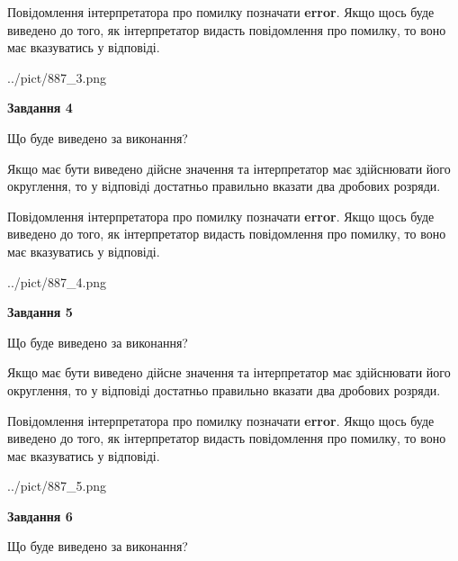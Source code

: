 \documentclass[12pt, ukrainian]{article}
\begin{document}
{\begin {Large}
Повідомлення інтерпретатора про помилку позначати \textbf{error}.
Якщо щось буде виведено до того, як інтерпретатор видасть повідомлення про помилку, 
то воно має вказуватись у відповіді. \par

\begin{center}
	{../pict/887_3.png}
\end{center}
\newpage

{\begin {center}\textbf{Завдання 4}\end {center}}\par
Що буде виведено за виконання? \par

Якщо має бути виведено дійсне значення та інтерпретатор має здійснювати його округлення, 
то у відповіді достатньо правильно вказати два дробових розряди.

Повідомлення інтерпретатора про помилку позначати \textbf{error}.
Якщо щось буде виведено до того, як інтерпретатор видасть повідомлення про помилку, 
то воно має вказуватись у відповіді. \par

\begin{center}
	{../pict/887_4.png}
\end{center}
\newpage

{\begin {center}\textbf{Завдання 5}\end {center}}\par
Що буде виведено за виконання? \par

Якщо має бути виведено дійсне значення та інтерпретатор має здійснювати його округлення, 
то у відповіді достатньо правильно вказати два дробових розряди.

Повідомлення інтерпретатора про помилку позначати \textbf{error}.
Якщо щось буде виведено до того, як інтерпретатор видасть повідомлення про помилку, 
то воно має вказуватись у відповіді. \par

\begin{center}
	{../pict/887_5.png}
\end{center}
\newpage

{\begin {center}\textbf{Завдання 6}\end {center}}\par
Що буде виведено за виконання? \par


\end{Large}}
\end{document}
